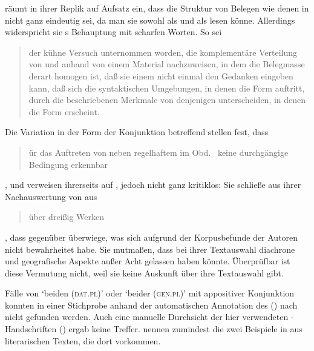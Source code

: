 \citet[187]{gjelsten1980} räumt in ihrer Replik auf 
Aufsatz ein, dass die Struktur von Belegen wie denen in 
nicht ganz eindeutig sei, da man sie sowohl als  und als  lesen
könne. Allerdings widerspricht sie \citeauthor{askedal1974}s Behauptung mit
scharfen Worten. So sei \blockcquote[196]{gjelsten1980}{der kühne Versuch
unternommen worden, die komplementäre Verteilung von  und 
anhand von einem Material nachzuweisen, in dem die Belegmasse derart homogen
ist, daß sie einem nicht einmal den Gedanken eingeben kann, daß sich die
syntaktischen Umgebungen, in denen die Form  auftritt, durch die
beschriebenen Merkmale von denjenigen unterscheiden, in denen die Form
 erscheint.}

Die Variation in der Form der Konjunktion betreffend stellen \citet[628]{ksw2}
fest, dass \blockquote{ür das Auftreten von  neben
regelhaftem  im Obd.\ \textelp{} keine durchgängige Bedingung
erkennbar }, und verweisen ihrerseits auf \citet{gjelsten1980},
jedoch nicht ganz kritiklos: Sie schließe aus ihrer Nachauswertung von
 aus
\blockcquote[198]{gjelsten1980}{über dreißig Werken}, dass 
gegenüber  überwiege, was sich aufgrund der Korpusbefunde der
Autoren nicht bewahrheitet habe. Sie mutmaßen, dass \citeauthor{gjelsten1980}
bei ihrer Textauswahl diachrone und geografische Aspekte außer Acht gelassen
haben könnte. Überprüfbar ist diese Vermutung nicht, weil sie keine Auskunft
über ihre Textauswahl gibt.

Fälle von  `beiden (\textsc{dat.pl})' oder  `beider
(\textsc{gen.pl})' mit appositiver Konjunktion konnten in einer
Stichprobe anhand der automatischen Annotation des  (\CAO) nach \citet{schmid2019} nicht
gefunden werden. Auch eine manuelle Durchsicht der hier verwendeten
-Handschriften (\KC) ergab keine Treffer. \citet[626]{ksw2}
nennen zumindest die zwei Beispiele in  aus literarischen
Texten, die dort  vorkommen.

